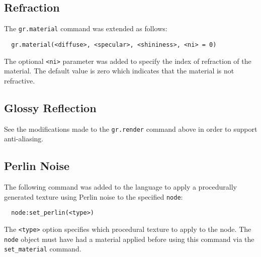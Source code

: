 \subsection*{Refraction}
The \verb|gr.material| command was extended as follows:
\begin{lstlisting}
  gr.material(<diffuse>, <specular>, <shininess>, <ni> = 0)
\end{lstlisting}
The optional \verb|<ni>| parameter was added to specify the index of refraction
of the material. The default value is zero which indicates that the material is
not refractive.

\subsection*{Glossy Reflection}
See the modifications made to the \verb|gr.render| command above in order to
support anti-aliasing.

\subsection*{Perlin Noise}
The following command was added to the language to apply a procedurally
generated texture using Perlin noise to the specified \verb|node|:
\begin{lstlisting}
  node:set_perlin(<type>)
\end{lstlisting}
The \verb|<type>| option specifies which procedural texture to apply to the
node. The \verb|node| object must have had a material applied before using this
command via the \verb|set_material| command.


